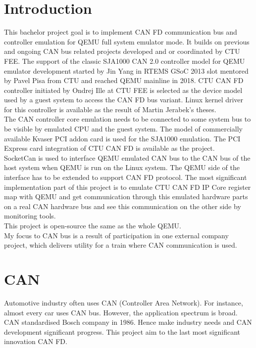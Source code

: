 \documentclass{ctuthesis}
\begin{document}
\maketitle
\chapter{Introduction}
 This bachelor project goal is to implement CAN FD communication bus and controller emulation for QEMU full system emulator mode. It builds on previous and ongoing CAN bus related projects developed and or coordinated by CTU FEE. The support of the classic SJA1000 CAN 2.0 controller model for QEMU emulator development started by Jin Yang in RTEMS GSoC 2013 slot mentored by Pavel Pisa from CTU and reached QEMU mainline in 2018. \cite{qemu-mainline} CTU CAN FD controller \cite{ctu-canfd-core} initiated by Ondrej Ille at CTU FEE is selected as the device model used by a guest system to access the CAN FD bus variant. Linux kernel driver for this controller is available as the result of Martin Jerabek's theses. \cite{ctu-canfd} \\
 The CAN controller core emulation needs to be connected to some system bus to be visible by emulated CPU and the guest system. The model of commercially available Kvaser PCI addon card is used for the SJA1000 emulation. The PCI Express card integration of CTU CAN FD is available as the project. \cite{ctu-project} \\
 SocketCan is used to interface QEMU emulated CAN bus to the CAN bus of the host system when QEMU is run on the Linux system. The QEMU side of the interface has to be extended to support CAN FD protocol.
 The most significant implementation part of this project is to emulate CTU CAN FD IP Core register map \cite{progdum} with QEMU and get communication through this emulated hardware parts on a real CAN hardware bus and see this communication on the other side by monitoring tools. \\
 This project is open-source the same as the whole QEMU. \\
 My focus to CAN bus is a result of participation in one external company
 project, which delivers utility for a train where CAN communication is used.

\chapter{CAN}
 Automotive industry often uses CAN (Controller Area Network).  For instance, almost every car uses CAN bus. However, the application spectrum is broad. CAN standardised Bosch company in 1986. Hence make industry needs and CAN development significant progress. This project aim to the last most significant innovation CAN FD.
\end{document}
